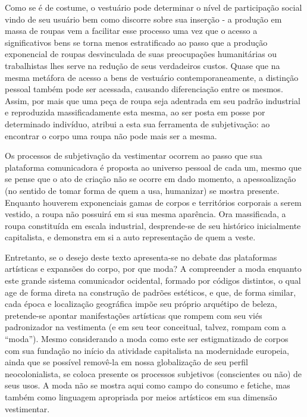 \begin{refsection}
    Como se é de costume, o vestuário pode determinar o nível de participação social vindo de seu usuário bem como discorre sobre sua inserção - a produção em massa de roupas vem a facilitar esse processo uma vez que o acesso a significativos bens se torna menos estratificado ao passo que a produção exponencial de roupas desvinculada de suas preocupações humanitárias ou trabalhistas lhes serve na redução de seus verdadeiros custos. Quase que na mesma metáfora de acesso a bens de vestuário contemporaneamente, a distinção pessoal também pode ser acessada, causando diferenciação entre os mesmos. Assim, por mais que uma peça de roupa seja adentrada em seu padrão industrial e reproduzida massificadamente esta mesma, ao ser posta em posse por determinado indivíduo, atribui a esta sua ferramenta de subjetivação: ao encontrar o corpo uma roupa não pode mais ser a mesma. 

    Os processos de subjetivação da vestimentar ocorrem ao passo que sua plataforma comunicadora é proposta ao universo pessoal de cada um, mesmo que se pense que o ato de criação não se ocorre em dado momento, a apessoalização (no sentido de tomar forma de quem a usa, humanizar) se mostra presente. Enquanto houverem exponenciais gamas de corpos e territórios corporais a serem vestido, a roupa não possuirá em si sua mesma aparência. Ora massificada, a roupa constituída em escala industrial, desprende-se de seu histórico inicialmente capitalista, e demonstra em si a auto representação de quem a veste. 

    Entretanto, se o desejo deste texto apresenta-se no debate das plataformas artísticas e expansões do corpo, por que moda? A compreender a moda enquanto este grande sistema comunicador ocidental, formado por códigos distintos, o qual age de forma direta na construção de padrões estéticos, e que, de forma similar, cada época e localização geográfica impõe seu próprio arquétipo de beleza, pretende-se apontar manifestações artísticas que rompem com seu viés padronizador na vestimenta (e em seu teor conceitual, talvez, rompam com a ``moda''). Mesmo considerando a moda como este ser estigmatizado de corpos com sua fundação no início da atividade capitalista na modernidade europeia, ainda que se possível removê-la em nossa globalização de seu perfil neocolonialista, se coloca presente os processos subjetivos (conscientes ou não) de seus usos. A moda não se mostra aqui como campo do consumo e fetiche, mas também como linguagem apropriada por meios artísticos em sua dimensão vestimentar. 


\end{refsection}
